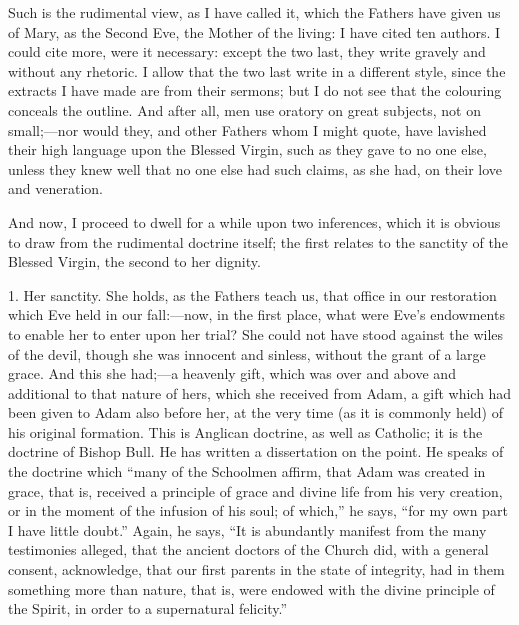 Such is the rudimental view, as I have called it, which the Fathers
have given us of Mary, as the Second Eve, the Mother of the living: I
have cited ten authors. I could cite more, were it necessary: except the
two last, they write gravely and without any rhetoric. I allow that the
two last write in a different style, since the extracts I have made are
from their sermons; but I do not see that the colouring conceals the
outline. And after all, men use oratory on great subjects, not on small;—nor
would they, and other Fathers whom I might quote, have lavished their
high language upon the Blessed Virgin, such as they gave to no one else,
unless they knew well that no one else had such claims, as she had, on
their love and veneration.

And now, I proceed to dwell for a while upon two inferences, which it
is obvious to draw from the rudimental doctrine itself; the first
relates to the sanctity of the Blessed Virgin, the second to her
dignity.

1. Her sanctity. She holds, as the Fathers teach us, that office in
our restoration which Eve held in our fall:—now, in the first place,
what were Eve's endowments to enable her to enter upon her trial? She
could not have stood against the wiles of the devil, though she was
innocent and sinless, without the grant of a large grace. And this she
had;—a heavenly gift, which was over and above and additional to that
nature of hers, which she received from Adam, a gift which had been
given to Adam also before her, at the very time (as it is commonly held)
of his original formation. This is Anglican doctrine, as well as
Catholic; it is the doctrine of Bishop Bull. He has written a
dissertation on the point. He speaks of the doctrine which ``many of
the Schoolmen affirm, that Adam was created in grace, that is, received
a principle of grace and divine life from his very creation, or in the
moment of the infusion of his soul; of which,'' he says, ``for
my own part I have little doubt.'' Again, he says, ``It is
abundantly manifest from the many testimonies alleged, that the ancient
doctors of the Church did, with a general consent, acknowledge, that our
first parents in the state of integrity, had in them something more than
nature, that is, were endowed with the divine principle of the Spirit,
in order to a supernatural felicity.''

